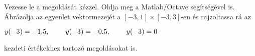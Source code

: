 Vezesse le a 
\de{} megoldását kézzel. 
Oldja meg a Matlab/Octave   segítségével is. 
Ábrázolja az egyenlet vektormezejét a $[-3,1]\times [-3,3]$-en és 
rajzoltassa rá az 
\centerline{$y(-3)=-1.5, \hspace{0.8cm} y(-3)=-0.5, \hspace{0.8cm} y(-3)=0$}
kezdeti értékekhez tartozó megoldásokat is.


